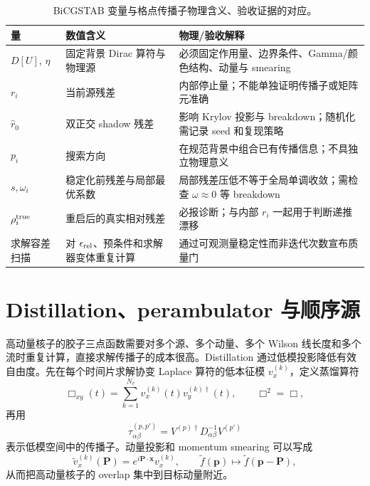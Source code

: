 \documentclass[UTF8,12pt,a4paper,twoside,openany]{ctexbook}
\begin{document}
\begin{table}[htbp]
\centering
\caption{BiCGSTAB 变量与格点传播子物理含义、验收证据的对应。}
\label{tab:solver-map}
\small
\begin{tabularx}{\textwidth}{L{2.1cm}L{4.0cm}Y}
\toprule
量 & 数值含义 & 物理/验收解释 \\
\midrule
\(D[U]\), \(\eta\) & 固定背景 Dirac 算符与物理源 & 必须固定作用量、边界条件、Gamma/颜色结构、动量与 smearing \\
\(r_i\) & 当前源残差 & 内部停止量；不能单独证明传播子或矩阵元准确 \\
\(\hat r_0\) & 双正交 shadow 残差 & 影响 Krylov 投影与 breakdown；随机化需记录 seed 和复现策略 \\
\(p_i\) & 搜索方向 & 在规范背景中组合已有传播信息；不具独立物理意义 \\
\(s,\omega_i\) & 稳定化前残差与局部最优系数 & 局部残差压低不等于全局单调收敛；需检查 \(\omega\approx0\) 等 breakdown \\
\(\rho_i^{\rm true}\) & 重启后的真实相对残差 & 必报诊断；与内部 \(r_i\) 一起用于判断递推漂移 \\
求解容差扫描 & 对 \(\epsilon_{\rm rel}\)、预条件和求解器变体重复计算 & 通过可观测量稳定性而非迭代次数宣布质量门 \\
\bottomrule
\end{tabularx}
\end{table}

\section{Distillation、perambulator 与顺序源}

高动量核子的胶子三点函数需要对多个源、多个动量、多个 Wilson 线长度和多个流时重复计算，直接求解传播子的成本很高。Distillation 通过低模投影降低有效自由度。先在每个时间片求解协变 Laplace 算符的低本征模 \(v_x^{(k)}\)，定义蒸馏算符
\begin{equation}
  \Box_{xy}(t)
  =\sum_{k=1}^{N_v}v_x^{(k)}(t)v_y^{(k)\dagger}(t),
  \qquad
  \Box^2=\Box,
  \label{eq:distillation}
\end{equation}
再用
\begin{equation}
  \tau^{(p,p')}_{\alpha\beta}
  =V^{(p)\dagger}
  D^{-1}_{\alpha\beta}
  V^{(p')}
  \label{eq:perambulator}
\end{equation}
表示低模空间中的传播子。动量投影和 momentum smearing 可以写成
\begin{equation}
  \widetilde v_x^{(k)}(\mathbf P)
  =e^{i\mathbf P\cdot\mathbf x}v_x^{(k)},\qquad
  \widetilde f(\mathbf p)\mapsto\widetilde f(\mathbf p-\mathbf P),
  \label{eq:momentumsmearing}
\end{equation}
从而把高动量核子的 overlap 集中到目标动量附近\cite{Bali2016,Peardon2009}。
\end{document}

